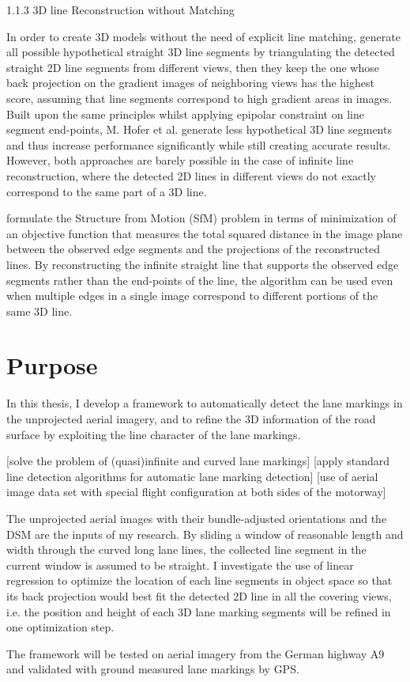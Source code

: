 1.1.3 3D line Reconstruction without Matching

In order to create 3D models without the need of explicit line matching, \citeauthor{JainJun2010} generate all possible hypothetical straight 3D line segments by triangulating the detected straight 2D line segments from different views, then they keep the one whose back projection on the gradient images of neighboring views has the highest score, assuming that line segments correspond to high gradient areas in images. Built upon the same principles whilst applying epipolar constraint on line segment end-points, M. Hofer et al. generate less hypothetical 3D line segments and thus increase performance significantly while still creating accurate results. However, both approaches are barely possible in the case of infinite line reconstruction, where the detected 2D lines in different views do not exactly correspond to the same part of a  3D line.

\citeauthor{TaylorNov1995} formulate the Structure from Motion (SfM) problem in terms of minimization of an objective function that measures the total squared distance in the image plane between the observed edge segments and the projections of the reconstructed lines. By reconstructing the infinite straight line that supports the observed edge segments rather than the end-points of the line, the algorithm can be used even when multiple edges in a single image correspond to different portions of the same 3D line.

\section{Purpose}

In this thesis, I develop a framework to automatically detect the lane markings in the unprojected aerial imagery, and to refine the 3D information of the road surface by exploiting the line character of the lane markings.

[solve the problem of (quasi)infinite and curved lane markings]
[apply standard line detection algorithms for automatic lane marking detection]
[use of aerial image data set with special flight configuration at both sides of the motorway]

The unprojected aerial images with their bundle-adjusted orientations and the DSM are the inputs of my research. By sliding a window of reasonable length and width through the curved long lane lines, the collected line segment in the current window is assumed to be straight. I investigate the use of linear regression to optimize the location of each line segments in object space so that its back projection would best fit the detected 2D line in all the covering views, i.e. the position and height of each 3D lane marking segments will be refined in one optimization step.

The framework will be tested on aerial imagery from the German highway A9 and validated with ground measured lane markings by GPS.
